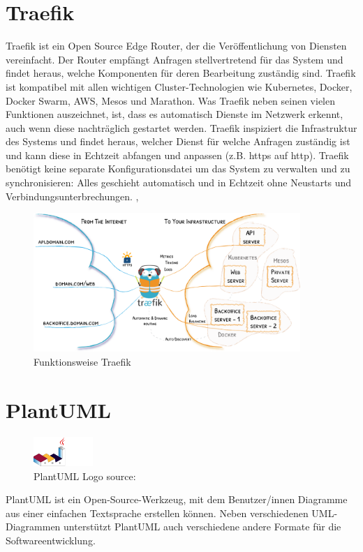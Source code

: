 \section{Traefik}
\label{cha:treafik}
Traefik ist ein Open Source Edge Router, der die Veröffentlichung von Diensten vereinfacht. 
Der Router empfängt Anfragen stellvertretend für das System und findet heraus, welche Komponenten für deren Bearbeitung 
zuständig sind. Traefik ist kompatibel mit allen wichtigen Cluster-Technologien wie Kubernetes, Docker, Docker Swarm, AWS, 
Mesos und Marathon. 
\newline
\newline
Was Traefik neben seinen vielen Funktionen auszeichnet, ist, dass es automatisch Dienste im Netzwerk erkennt, auch wenn diese nachträglich gestartet werden. 
Traefik inspiziert die Infrastruktur des Systems und findet heraus, welcher Dienst für welche 
Anfragen zuständig ist und kann diese in Echtzeit abfangen und anpassen (z.B. https auf http). 
Traefik benötigt keine separate Konfigurationsdatei um das System zu verwalten und zu synchronisieren: 
Alles geschieht automatisch und in Echtzeit ohne Neustarts und Verbindungsunterbrechungen. \cite{noauthor_traefik_nodate}, \cite{noauthor_traefiktraefik_nodate}
\begin{figure}[H]
  \includegraphics[width=0.9\textwidth]{pics/traefik-architecture.png}
  \centering
  \caption{Funktionsweise Traefik}
\end{figure}

\section{PlantUML}
\label{chap:plantuml}

\begin{figure}[!htb]
        \includegraphics[width=0.2\textwidth]{pics/PlantumlLogo.png}
        \centering
        \caption{PlantUML Logo source: \cite{noauthor_plantuml_nodate}}
\end{figure}
PlantUML ist ein Open-Source-Werkzeug, mit dem Benutzer/innen Diagramme aus einer einfachen Textsprache 
erstellen können. Neben verschiedenen UML-Diagrammen unterstützt PlantUML auch verschiedene andere 
Formate für die Softwareentwicklung. \cite{noauthor_plantuml_2022}


